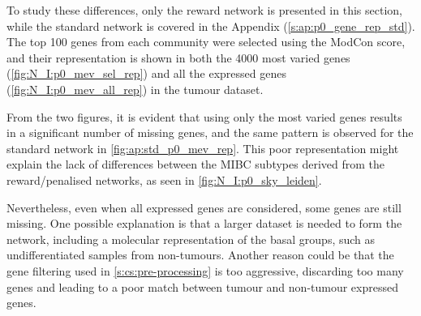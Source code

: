To study these differences, only the reward network is presented in this section, while the standard network is covered in the Appendix (\cref{s:ap:p0_gene_rep_std}). The top 100 genes from each community were selected using the ModCon score, and their representation is shown in both the 4000 most varied genes (\cref{fig:N_I:p0_mev_sel_rep}) and all the expressed genes (\cref{fig:N_I:p0_mev_all_rep}) in the tumour dataset.

From the two figures, it is evident that using only the most varied genes results in a significant number of missing genes, and the same pattern is observed for the standard network in \cref{fig:ap:std_p0_mev_rep}. This poor representation might explain the lack of differences between the MIBC subtypes derived from the reward/penalised networks, as seen in \cref{fig:N_I:p0_sky_leiden}.

Nevertheless, even when all expressed genes are considered, some genes are still missing. One possible explanation is that a larger dataset is needed to form the network, including a molecular representation of the basal groups, such as undifferentiated samples from non-tumours. Another reason could be that the gene filtering used in \cref{s:cs:pre-processing} is too aggressive, discarding too many genes and leading to a poor match between tumour and non-tumour expressed genes.


